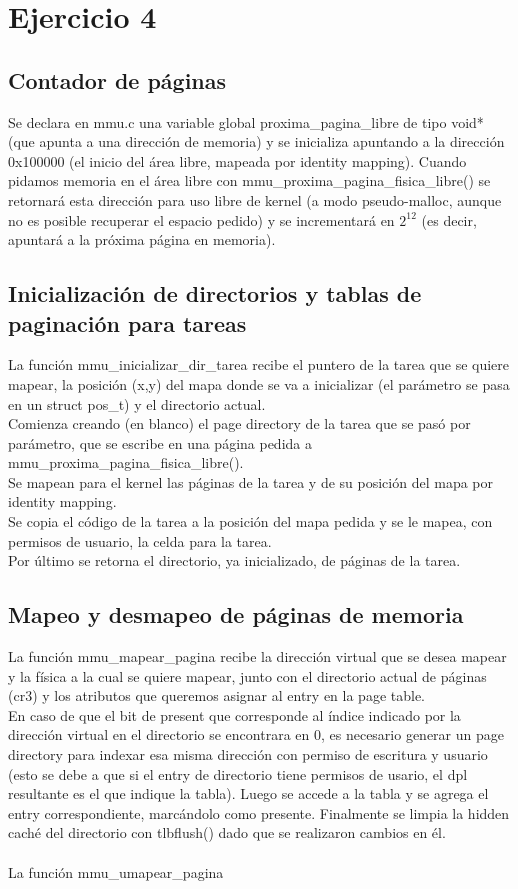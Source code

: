 \section{Ejercicio 4}

\subsection{Contador de páginas}
Se declara en mmu.c una variable global proxima_pagina_libre de tipo void* (que apunta a una dirección de memoria) y se inicializa apuntando a la dirección 0x100000 (el inicio del área libre, mapeada por identity mapping). Cuando pidamos memoria en el área libre con mmu_proxima_pagina_fisica_libre() se retornará esta dirección para uso libre de kernel (a modo pseudo-malloc, aunque no es posible recuperar el espacio pedido) y se incrementará en $2^{12}$ (es decir, apuntará a la próxima página en memoria). \\

\subsection{Inicialización de directorios y tablas de paginación para tareas}
La función mmu_inicializar_dir_tarea recibe el puntero de la tarea que se quiere mapear, la posición (x,y) del mapa donde se va a inicializar (el parámetro se pasa en un struct pos_t) y el directorio actual. \\
Comienza creando (en blanco) el page directory de la tarea que se pasó por parámetro, que se escribe en una página pedida a mmu_proxima_pagina_fisica_libre(). \\
Se mapean para el kernel las páginas de la tarea y de su posición del mapa por identity mapping.  \\
Se copia el código de la tarea a la posición del mapa pedida y se le mapea, con permisos de usuario, la celda para la tarea. \\
Por último se retorna el directorio, ya inicializado, de páginas de la tarea.

\subsection{Mapeo y desmapeo de páginas de memoria}
La función mmu_mapear_pagina recibe la dirección virtual que se desea mapear y la física a la cual se quiere mapear, junto con el directorio actual de páginas (cr3) y los atributos que queremos asignar al entry en la page table. \\
En caso de que el bit de present que corresponde al índice indicado por la dirección virtual en el directorio se encontrara en 0, es necesario generar un page directory para indexar esa misma dirección con permiso de escritura y usuario (esto se debe a que si el entry de directorio tiene permisos de usario, el dpl resultante es el que indique la tabla).
Luego se accede a la tabla y se agrega el entry correspondiente, marcándolo como presente. 
Finalmente se limpia la hidden caché del directorio con tlbflush() dado que se realizaron cambios en él.\\
\\
La función mmu_umapear_pagina
